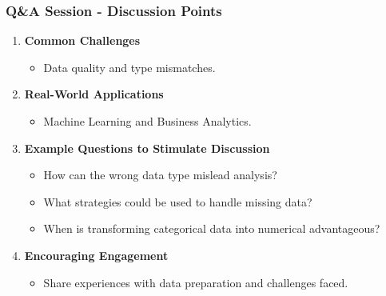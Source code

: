 \documentclass{beamer}
\begin{document}
\begin{frame}[fragile]
    \frametitle{Q\&A Session - Discussion Points}
    \begin{enumerate}
        \item \textbf{Common Challenges}
        \begin{itemize}
            \item Data quality and type mismatches.
        \end{itemize}

        \item \textbf{Real-World Applications}
        \begin{itemize}
            \item Machine Learning and Business Analytics.
        \end{itemize}

        \item \textbf{Example Questions to Stimulate Discussion}
        \begin{itemize}
            \item How can the wrong data type mislead analysis?
            \item What strategies could be used to handle missing data?
            \item When is transforming categorical data into numerical advantageous?
        \end{itemize}

        \item \textbf{Encouraging Engagement}
        \begin{itemize}
            \item Share experiences with data preparation and challenges faced.
        \end{itemize}
    \end{enumerate}
\end{frame}
\end{document}
